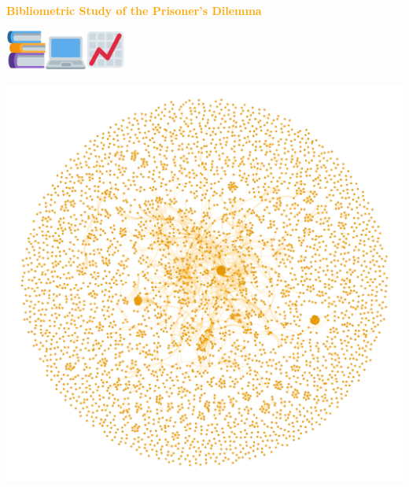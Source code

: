 \documentclass{beamer}
\begin{document}
\begin{frame}
    \begin{center}
    \textcolor{orange}{\large{\textbf{Bibliometric Study of the Prisoner's Dilemma}}} \vspace{1cm}
    
    \includegraphics[width=0.10\textwidth]{static/books.png}\hspace{2pt}\includegraphics[width=0.10\textwidth]{static/pc.png}\hspace{2pt}\includegraphics[width=0.10\textwidth]{static/chart.png}
    \end{center}
\end{frame}

\begin{frame}
    \begin{center}
    
    \end{center}
\end{frame}

\begin{frame}
    \begin{center}
    
    \end{center}
\end{frame}

\begin{frame}
    \begin{center}
        \includegraphics[width=.7\textwidth]{static/pd.png}
    \end{center}
\end{frame}
\end{document}
